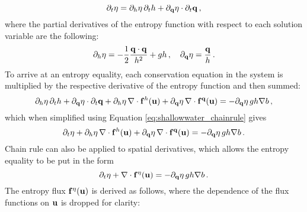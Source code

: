 \begin{equation}\label{eq:shallowwater_chainrule}
  \partial_t\eta
  = \partial_h\eta\,\partial_th
  + \partial_{\mathbf{q}}\eta\cdot\partial_t\mathbf{q} \,,
\end{equation}
where the partial derivatives of the entropy function with respect to each
solution variable are the following:
\begin{equation}
  \partial_h\eta
  = -\frac{1}{2}\frac{\mathbf{q}\cdot\mathbf{q}}{h^2}
  + gh \,,
  \quad
  \partial_{\mathbf{q}}\eta = \frac{\mathbf{q}}{h} \,.
\end{equation}
To arrive at an entropy equality, each conservation equation in the system
is multiplied by the respective derivative of the entropy function and then
summed:
\begin{equation}
  \partial_h\eta\,\partial_th
  + \partial_{\mathbf{q}}\eta\cdot\partial_t\mathbf{q}
  + \partial_h\eta\,\nabla\cdot
    \mathbf{f}^h(\mathbf{u})
  + \partial_{\mathbf{q}}\eta\,\nabla\cdot 
    \mathbf{f}^{\mathbf{q}}(\mathbf{u})
  = - \partial_{\mathbf{q}}\eta\,gh\nabla b \,,
\end{equation}
which when simplified using Equation \eqref{eq:shallowwater_chainrule} gives
\begin{equation}
  \partial_t\eta
  + \partial_h\eta\,\nabla\cdot
    \mathbf{f}^h(\mathbf{u})
  + \partial_{\mathbf{q}}\eta\,\nabla\cdot
    \mathbf{f}^{\mathbf{q}}(\mathbf{u})
  = - \partial_{\mathbf{q}}\eta\,gh\nabla b \,.
\end{equation}
Chain rule can also be applied to spatial derivatives, which allows the
entropy equality to be put in the form
\begin{equation}
  \partial_t\eta
  + \nabla\cdot\mathbf{f}^\eta(\mathbf{u})
  = - \partial_{\mathbf{q}}\eta\,gh\nabla b \,.
\end{equation}
The entropy flux $\mathbf{f}^\eta(\mathbf{u})$ is
derived as follows, where the dependence of the flux functions on
$\mathbf{u}$ is dropped for clarity:
